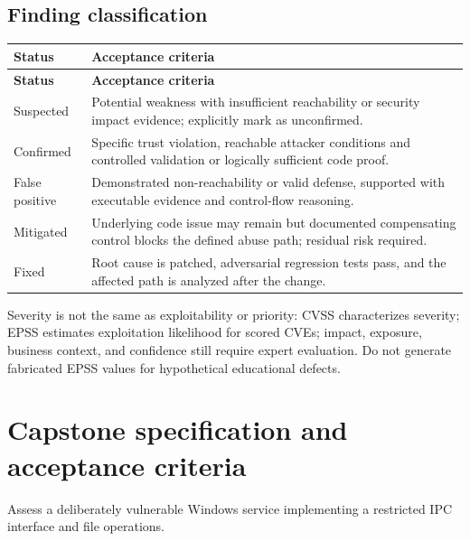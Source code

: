 \documentclass[10pt,letterpaper]{article}
\begin{document}
\subsection{Finding classification}
\begingroup\footnotesize\setlength\tabcolsep{3pt}
\begin{longtable}{>{\raggedright\arraybackslash}p{}>{\raggedright\arraybackslash}p{}}\toprule
\textbf{Status} & \textbf{Acceptance criteria}\\\midrule\endfirsthead
\toprule \textbf{Status} & \textbf{Acceptance criteria}\\\midrule\endhead
Suspected & Potential weakness with insufficient reachability or security impact evidence; explicitly mark as unconfirmed.\\\midrule
Confirmed & Specific trust violation, reachable attacker conditions and controlled validation or logically sufficient code proof.\\\midrule
False positive & Demonstrated non-reachability or valid defense, supported with executable evidence and control-flow reasoning.\\\midrule
Mitigated & Underlying code issue may remain but documented compensating control blocks the defined abuse path; residual risk required.\\\midrule
Fixed & Root cause is patched, adversarial regression tests pass, and the affected path is analyzed after the change.\\\midrule
\bottomrule\end{longtable}\endgroup
Severity is not the same as exploitability or priority: CVSS characterizes severity; EPSS estimates exploitation likelihood for scored CVEs; impact, exposure, business context, and confidence still require expert evaluation. Do not generate fabricated EPSS values for hypothetical educational defects.

\section{Capstone specification and acceptance criteria}
Assess a deliberately vulnerable Windows service implementing a restricted IPC interface and file operations.
\end{document}
